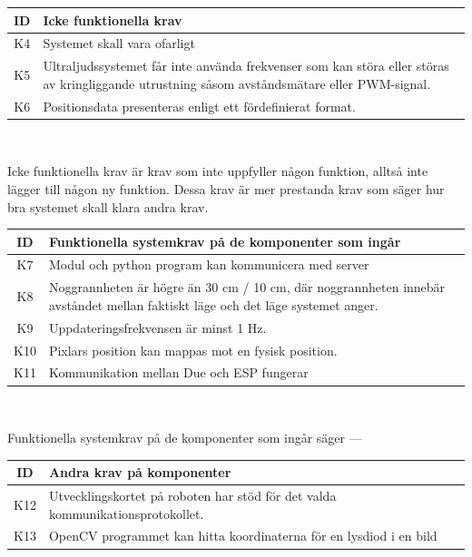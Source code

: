 \documentclass[11pt, a4paper]{report}
\begin{document}
\begin{center}
	\begin{tabular}{c | p{13.5cm}}
	ID & Icke funktionella krav \\ \hline
	K4 & Systemet skall vara ofarligt \\
	K5 & Ultraljudssystemet får inte använda frekvenser som kan störa eller störas av kringliggande utrustning såsom avståndsmätare eller PWM-signal. \\
	K6 & Positionsdata presenteras enligt ett fördefinierat format. \\
	\end{tabular}
	\\ [0.5cm]
\end{center}

Icke funktionella krav är krav som inte uppfyller någon funktion, alltså inte lägger till någon ny funktion. Dessa krav är mer prestanda krav som säger hur bra systemet skall klara andra krav.

\begin{center}
	\begin{tabular}{c | p{13.5cm}}
	ID & Funktionella systemkrav på de komponenter som ingår \\ \hline
	K7 & Modul och python program kan kommunicera med server \\
	K8 & Noggrannheten är högre än 30 cm / 10 cm, där noggrannheten innebär avståndet mellan faktiskt läge och det läge systemet anger. \\
	K9 & Uppdateringsfrekvensen är minst 1 Hz. \\
	K10 & Pixlars position kan mappas mot en fysisk position. \\
	K11 & Kommunikation mellan Due och ESP fungerar \\	
	\end{tabular}
	\\ [0.5cm]
\end{center}

Funktionella systemkrav på de komponenter som ingår säger ---

\begin{center}
	\begin{tabular}{c | p{13.5cm}}
	ID & Andra krav på komponenter \\ \hline
	K12 & Utvecklingskortet på roboten har stöd för det valda kommunikationsprotokollet. \\
	K13 & OpenCV programmet kan hitta koordinaterna för en lysdiod i en bild \\	
	\end{tabular}
	\\ [0.5cm]
\end{center}
\end{document}
